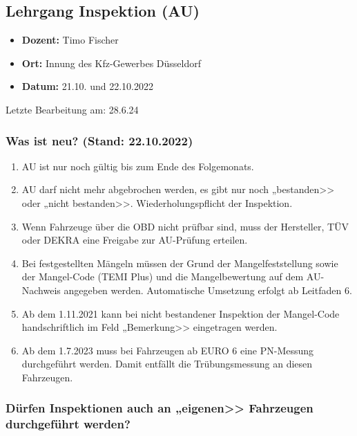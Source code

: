 \documentclass{vorlage-design-main}
\begin{document}
\newpage

\subsection{Lehrgang Inspektion (AU)}\label{lehrgang-inspektion-au}

\begin{itemize}

\item
  \textbf{Dozent:} Timo Fischer
\item
  \textbf{Ort:} Innung des Kfz-Gewerbes Düsseldorf
\item
  \textbf{Datum:} 21.10. und 22.10.2022
\end{itemize}

Letzte Bearbeitung am: 28.6.24

\subsubsection{Was ist neu? (Stand:
22.10.2022)}\label{was-ist-neu-stand-22.10.2022}

\begin{enumerate}
\def\labelenumi{\arabic{enumi}.}

\item
  AU ist nur noch gültig bis zum Ende des Folgemonats.
\item
  AU darf nicht mehr abgebrochen werden, es gibt nur noch „bestanden>>
  oder „nicht bestanden>>. Wiederholungspflicht der Inspektion.
\item
  Wenn Fahrzeuge über die OBD nicht prüfbar sind, muss der Hersteller,
  TÜV oder DEKRA eine Freigabe zur AU-Prüfung erteilen.
\item
  Bei festgestellten Mängeln müssen der Grund der Mangelfeststellung
  sowie der Mangel-Code (TEMI Plus) und die Mangelbewertung auf dem
  AU-Nachweis angegeben werden. Automatische Umsetzung erfolgt ab
  Leitfaden 6.
\item
  Ab dem 1.11.2021 kann bei nicht bestandener Inspektion der Mangel-Code
  handschriftlich im Feld „Bemerkung>> eingetragen werden.
\item
  Ab dem 1.7.2023 muss bei Fahrzeugen ab EURO 6 eine PN-Messung
  durchgeführt werden. Damit entfällt die Trübungsmessung an diesen
  Fahrzeugen.
\end{enumerate}

\subsubsection{Dürfen Inspektionen auch an „eigenen>> Fahrzeugen
durchgeführt
werden?}\label{duerfen-inspektionen-auch-an-eigenen-fahrzeugen-durchgefuehrt-werden}
\end{document}
